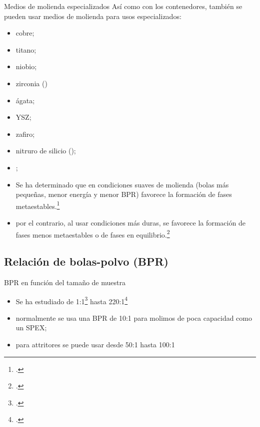 \documentclass[%
spanish,
progressbar=head,
subsectionpage,
aspectratio=169
]{beamer}
\begin{document}
\begin{frame}{Medios de molienda especializados}
    Así como con los contenedores, también se pueden usar medios de molienda para usos especializados:
    \begin{itemize}[<+-| alert@+>]
        \item cobre;
        \item titano;
        \item niobio;
        \item zirconia ()
        \item ágata;
        \item \gls{YSZ};
        \item zafiro;
        \item nitruro de silicio ();
        \item {};
    \end{itemize}
\end{frame}

\begin{frame}
    \begin{itemize}
        \item<1-> Se ha determinado que en \alert<2>{condiciones suaves} de molienda (bolas más pequeñas, menor energía y menor \gls{BPR}) favorece la formación de \alert<2>{fases metaestables.\footcite{suryanarayanaPhaseSelectionMechanically1999}}
        \item<2-> por el contrario, al usar \alert<3>{condiciones más duras,} se favorece la formación de \alert<3>{fases menos metaestables o de fases en equilibrio.\footcite{gerasimovTribochemicalEquilibriumMechanical1991}}
    \end{itemize}
\end{frame}

\subsection{Relación de bolas-polvo (BPR)}

\begin{frame}{BPR en función del tamaño de muestra}
    \begin{itemize}
        \item Se ha estudiado de 1:1\footcite{chinAmorphizationNiSiCTernary1996} hasta 220:1\footcite{kis-vargaPhaseTransitionsCuSb1996}
        \item normalmente se usa una \gls{BPR} de 10:1 para molimos de poca capacidad como un SPEX;
        \item para attritores se puede usar desde 50:1 hasta 100:1
    \end{itemize}
\end{frame}
\end{document}

